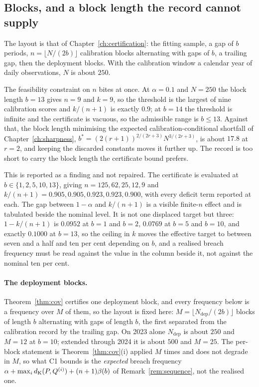 \documentclass[../../../main.tex]{subfiles}
\begin{document}
\subsection{Blocks, and a block length the record cannot supply}

The layout is that of Chapter~\ref{ch:certification}: the fitting sample, a gap of $b$ periods, $n=\lfloor N/(2b)\rfloor$ calibration blocks alternating with gaps of $b$, a trailing gap, then the deployment blocks. With the calibration window a calendar year of daily observations, $N$ is about $250$.

The feasibility constraint on $n$ bites at once. At $\alpha=0.1$ and $N=250$ the block length $b=13$ gives $n=9$ and $k=9$, so the threshold is the largest of nine calibration scores and $k/(n+1)$ is exactly $0.9$; at $b=14$ the threshold is infinite and the certificate is vacuous, so the admissible range is $b\le13$. Against that, the block length minimising the expected calibration-conditional shortfall of Chapter~\ref{ch:sharpness}, $b^*=(2(r+1))^{2/(2r+3)}N^{3/(2r+3)}$, is about $17.8$ at $r=2$, and keeping the discarded constants moves it further up. The record is too short to carry the block length the certificate bound prefers.

This is reported as a finding and not repaired. The certificate is evaluated at $b\in\{1,2,5,10,13\}$, giving $n=125,62,25,12,9$ and $k/(n+1)=0.905,0.905,0.923,0.923,0.900$, with every deficit term reported at each. The gap between $1-\alpha$ and $k/(n+1)$ is a visible finite-$n$ effect and is tabulated beside the nominal level. It is not one displaced target but three: $1-k/(n+1)$ is $0.0952$ at $b=1$ and $b=2$, $0.0769$ at $b=5$ and $b=10$, and exactly $0.1000$ at $b=13$, so the ceiling in $k$ moves the effective target to between seven and a half and ten per cent depending on $b$, and a realised breach frequency must be read against the value in the column beside it, not against the nominal ten per cent.

\paragraph{The deployment blocks.} Theorem~\ref{thm:cov} certifies one deployment block, and every frequency below is a frequency over $M$ of them, so the layout is fixed here: $M=\lfloor N_{\mathrm{dep}}/(2b)\rfloor$ blocks of length $b$ alternating with gaps of length $b$, the first separated from the calibration record by the trailing gap. On 2023 alone $N_{\mathrm{dep}}$ is about $250$ and $M=12$ at $b=10$; extended through 2024 it is about $500$ and $M=25$. The per-block statement is Theorem~\ref{thm:cov}(i) applied $M$ times and does not degrade in $M$, so what C1 bounds is the \emph{expected} breach frequency $\alpha+\max_id_{\mathrm{K}}(P,Q^{(i)})+(n+1)\beta(b)$ of Remark~\ref{rem:sequence}, not the realised one.
\end{document}
